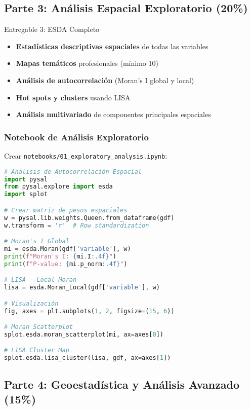 \documentclass[12pt,a4paper]{article}
\begin{document}
\subsection{Parte 3: Análisis Espacial Exploratorio (20\%)}

\begin{deliverable}{Entregable 3: ESDA Completo}
\begin{itemize}
    \item \textbf{Estadísticas descriptivas espaciales} de todas las variables
    \item \textbf{Mapas temáticos} profesionales (mínimo 10)
    \item \textbf{Análisis de autocorrelación} (Moran's I global y local)
    \item \textbf{Hot spots y clusters} usando LISA
    \item \textbf{Análisis multivariado} de componentes principales espaciales
\end{itemize}
\end{deliverable}

\subsubsection{Notebook de Análisis Exploratorio}

Crear \texttt{notebooks/01\_exploratory\_analysis.ipynb}:

\begin{lstlisting}[language=Python]
# Análisis de Autocorrelación Espacial
import pysal
from pysal.explore import esda
import splot

# Crear matriz de pesos espaciales
w = pysal.lib.weights.Queen.from_dataframe(gdf)
w.transform = 'r'  # Row standardization

# Moran's I Global
mi = esda.Moran(gdf['variable'], w)
print(f"Moran's I: {mi.I:.4f}")
print(f"P-value: {mi.p_norm:.4f}")

# LISA - Local Moran
lisa = esda.Moran_Local(gdf['variable'], w)

# Visualización
fig, axes = plt.subplots(1, 2, figsize=(15, 6))

# Moran Scatterplot
splot.esda.moran_scatterplot(mi, ax=axes[0])

# LISA Cluster Map
splot.esda.lisa_cluster(lisa, gdf, ax=axes[1])
\end{lstlisting}

\subsection{Parte 4: Geoestadística y Análisis Avanzado (15\%)}
\end{document}
